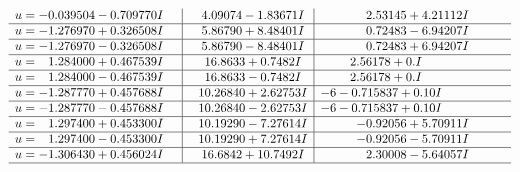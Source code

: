 \documentclass[1p]{elsarticle_modified}
\theoremstyle{definition}
\begin{document}
$$\begin{array}{c|c|c}
\begin{aligned}
u &= -0.039504 - 0.709770 I\end{aligned}
 & \phantom{-}4.09074 - 1.83671 I & \phantom{-}2.53145 + 4.21112 I \\ \hline\begin{aligned}
u &= -1.276970 + 0.326508 I\end{aligned}
 & \phantom{-}5.86790 + 8.48401 I & \phantom{-}0.72483 - 6.94207 I \\ \hline\begin{aligned}
u &= -1.276970 - 0.326508 I\end{aligned}
 & \phantom{-}5.86790 - 8.48401 I & \phantom{-}0.72483 + 6.94207 I \\ \hline\begin{aligned}
u &= \phantom{-}1.284000 + 0.467539 I\end{aligned}
 & \phantom{-}16.8633 + 0.7482 I & \phantom{-}2.56178 + 0. I\phantom{ +0.000000I} \\ \hline\begin{aligned}
u &= \phantom{-}1.284000 - 0.467539 I\end{aligned}
 & \phantom{-}16.8633 - 0.7482 I & \phantom{-}2.56178 + 0. I\phantom{ +0.000000I} \\ \hline\begin{aligned}
u &= -1.287770 + 0.457688 I\end{aligned}
 & \phantom{-}10.26840 + 2.62753 I &                  -6
-0.715837 + 0. 10   I\phantom{ +0.000000I} \\ \hline\begin{aligned}
u &= -1.287770 - 0.457688 I\end{aligned}
 & \phantom{-}10.26840 - 2.62753 I &                  -6
-0.715837 + 0. 10   I\phantom{ +0.000000I} \\ \hline\begin{aligned}
u &= \phantom{-}1.297400 + 0.453300 I\end{aligned}
 & \phantom{-}10.19290 - 7.27614 I & -0.92056 + 5.70911 I \\ \hline\begin{aligned}
u &= \phantom{-}1.297400 - 0.453300 I\end{aligned}
 & \phantom{-}10.19290 + 7.27614 I & -0.92056 - 5.70911 I \\ \hline\begin{aligned}
u &= -1.306430 + 0.456024 I\end{aligned}
 & \phantom{-}16.6842 + 10.7492 I & \phantom{-}2.30008 - 5.64057 I\\
 \hline 
 \end{array}$$\newpage$$\begin{array}{c|c|c}  

\end{array}$$
\end{document}
